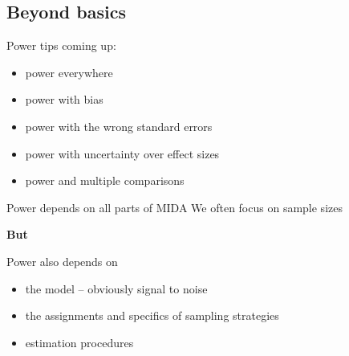 \documentclass[
  11pt,
  ignorenonframetext,
]{beamer}
\providecommand{\tightlist}{%
  \setlength{\itemsep}{0pt}\setlength{\parskip}{0pt}}\usepackage{longtable,booktabs,array}
\begin{document}
\hypertarget{beyond-basics}{%
\subsection{Beyond basics}\label{beyond-basics}}

\begin{frame}{Power tips}
\protect\hypertarget{power-tips}{}
coming up:

\begin{itemize}
\tightlist
\item
  power everywhere
\item
  power with bias
\item
  power with the wrong standard errors
\item
  power with uncertainty over effect sizes
\item
  power and multiple comparisons
\end{itemize}
\end{frame}

\begin{frame}{Power depends on all parts of MIDA}
\protect\hypertarget{power-depends-on-all-parts-of-mida}{}
We often focus on sample sizes

\textbf{But}

Power also depends on

\begin{itemize}
\tightlist
\item
  the model -- obviously signal to noise
\item
  the assignments and specifics of sampling strategies
\item
  estimation procedures
\end{itemize}
\end{frame}
\end{document}
